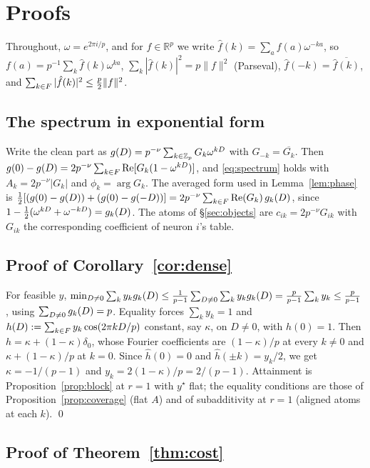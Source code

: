 \section{Proofs}
\label{app:proofs}

Throughout, $\omega=e^{2\pi i/p}$, and for $f\in\mathbb{R}^p$ we write $\hat f(k)=\sum_af(a)\omega^{-ka}$,
so $f(a)=p^{-1}\sum_k\hat f(k)\omega^{ka}$, $\sum_k|\hat f(k)|^2=p\|f\|^2$ (Parseval), $\hat f(-k)=\overline{\hat f(k)}$,
and $\sum_{k\in F}|\hat f(k)|^2\le\tfrac p2\|f\|^2$.

\subsection{The spectrum in exponential form}
\label{app:spectrum}

Write the clean part as $g(D)=p^{-\nu}\sum_{k\in\mathbb{Z}_p}G_k\omega^{kD}$ with $G_{-k}=\overline{G_k}$. Then
$g(0)-g(D)=2p^{-\nu}\sum_{k\in F}\mathrm{Re}[G_k(1-\omega^{kD})]$, and \eqref{eq:spectrum} holds with
$A_k=2p^{-\nu}|G_k|$ and $\phi_k=\arg G_k$. The averaged form used in Lemma~\ref{lem:phase} is
$\tfrac12[(g(0)-g(D))+(g(0)-g(-D))]=2p^{-\nu}\sum_{k\in F}\mathrm{Re}(G_k)\,g_{k}(D)$,
since $1-\tfrac12(\omega^{kD}+\omega^{-kD})=g_{k}(D)$. The atoms of \S\ref{sec:objects} are
$c_{ik}=2p^{-\nu}G_{ik}$ with $G_{ik}$ the corresponding coefficient of neuron $i$'s table.

\subsection{Proof of Corollary~\ref{cor:dense}}
\label{app:dense}

For feasible $y$, $\min_{D\neq0}\sum_ky_kg_{k}(D)\le\frac1{p-1}\sum_{D\neq0}\sum_ky_kg_{k}(D)=\frac p{p-1}\sum_ky_k\le\frac p{p-1}$,
using $\sum_{D\neq0}g_{k}(D)=p$. Equality forces $\sum_ky_k=1$ and $h(D):=\sum_{k\in F}y_k\cos(2\pi kD/p)$
constant, say $\kappa$, on $D\neq0$, with $h(0)=1$. Then $h=\kappa+(1-\kappa)\delta_0$, whose Fourier
coefficients are $(1-\kappa)/p$ at every $k\neq0$ and $\kappa+(1-\kappa)/p$ at $k=0$. Since $\hat h(0)=0$ and
$\hat h(\pm k)=y_k/2$, we get $\kappa=-1/(p-1)$ and $y_k=2(1-\kappa)/p=2/(p-1)$. Attainment is
Proposition~\ref{prop:block} at $r=1$ with $y^\star$ flat; the equality conditions are those of
Proposition~\ref{prop:coverage} (flat $A$) and of subadditivity at $r=1$ (aligned atoms at each $k$).
\qed

\subsection{Proof of Theorem~\ref{thm:cost}}
\label{app:cost}

